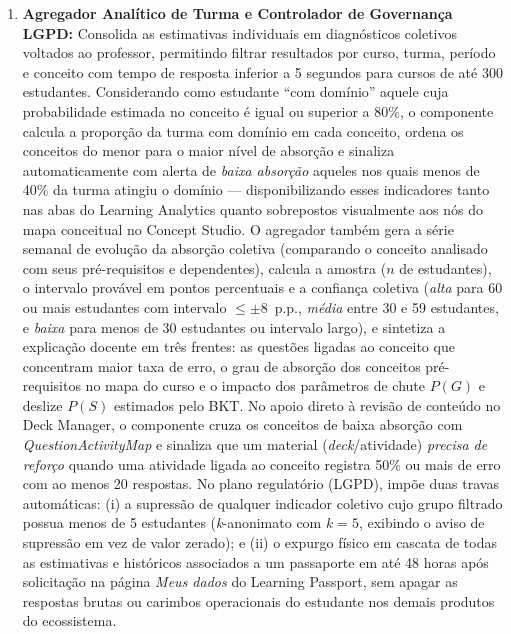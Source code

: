 \begin{enumerate}
    \item \textbf{Agregador Analítico de Turma e Controlador de Governança LGPD:} Consolida as estimativas individuais em diagnósticos coletivos voltados ao professor, permitindo filtrar resultados por curso, turma, período e conceito com tempo de resposta inferior a 5 segundos para cursos de até 300 estudantes. Considerando como estudante ``com domínio'' aquele cuja probabilidade estimada no conceito é igual ou superior a 80\%, o componente calcula a proporção da turma com domínio em cada conceito, ordena os conceitos do menor para o maior nível de absorção e sinaliza automaticamente com alerta de \textit{baixa absorção} aqueles nos quais menos de 40\% da turma atingiu o domínio — disponibilizando esses indicadores tanto nas abas do Learning Analytics quanto sobrepostos visualmente aos nós do mapa conceitual no Concept Studio. O agregador também gera a série semanal de evolução da absorção coletiva (comparando o conceito analisado com seus pré-requisitos e dependentes), calcula a amostra ($n$ de estudantes), o intervalo provável em pontos percentuais e a confiança coletiva (\textit{alta} para 60 ou mais estudantes com intervalo $\le \pm 8$~p.p., \textit{média} entre 30 e 59 estudantes, e \textit{baixa} para menos de 30 estudantes ou intervalo largo), e sintetiza a explicação docente em três frentes: as questões ligadas ao conceito que concentram maior taxa de erro, o grau de absorção dos conceitos pré-requisitos no mapa do curso e o impacto dos parâmetros de chute $P(G)$ e deslize $P(S)$ estimados pelo BKT. No apoio direto à revisão de conteúdo no Deck Manager, o componente cruza os conceitos de baixa absorção com \textit{QuestionActivityMap} e sinaliza que um material (\textit{deck}/atividade) \textit{precisa de reforço} quando uma atividade ligada ao conceito registra 50\% ou mais de erro com ao menos 20 respostas. No plano regulatório (LGPD), impõe duas travas automáticas: (i) a supressão de qualquer indicador coletivo cujo grupo filtrado possua menos de 5 estudantes (\textit{k}-anonimato com $k = 5$, exibindo o aviso de supressão em vez de valor zerado); e (ii) o expurgo físico em cascata de todas as estimativas e históricos associados a um passaporte em até 48 horas após solicitação na página \textit{Meus dados} do Learning Passport, sem apagar as respostas brutas ou carimbos operacionais do estudante nos demais produtos do ecossistema.


\end{enumerate}
